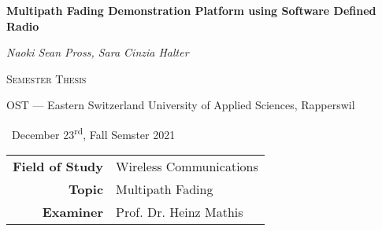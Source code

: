 
\begin{titlepage}
	\centering

	{\huge\bfseries\sffamily
		Multipath Fading Demonstration Platform using Software Defined Radio
	\par}

	\vspace{1cm}

	{\large\slshape
		Naoki Sean Pross, \qquad Sara Cinzia Halter
	\par}

	\vspace{1cm}

	{\scshape
		Semester Thesis
	\par}

	{
		OST --- Eastern Switzerland University of Applied Sciences, Rapperswil
	\par}

	{\
		December 23\textsuperscript{rd}, Fall Semster 2021
	\par}

	\vfill
	\resizebox{.9\linewidth}{!}{
		
	}
	\vfill

	\begin{tabular}{rl}
		\bfseries\sffamily Field of Study & Wireless Communications \\
		\bfseries\sffamily Topic          & Multipath Fading        \\
		\bfseries\sffamily Examiner       & Prof. Dr. Heinz Mathis  \\
	\end{tabular}
	\restoregeometry
\end{titlepage}
